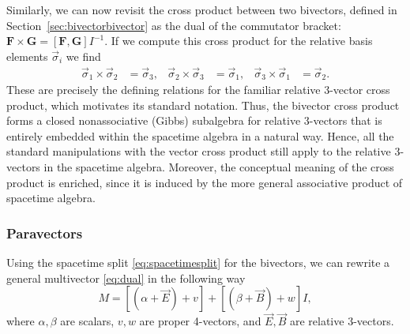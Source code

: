 \documentclass[1p,sort&compress]{elsarticle}
\numberwithin{equation}{section}
\newcommand{\rv}[1]{\vec{#1}}
\newcommand{\bv}[1]{\mathbf{#1}}
\begin{document}
Similarly, we can now revisit the cross product between two bivectors, defined in Section~\ref{sec:bivectorbivector} as the dual of the commutator bracket: $\bv{F}\times\bv{G} = [\bv{F},\bv{G}]I^{-1}$.  If we compute this cross product for the relative basis elements $\rv{\sigma}_i$ we find
\begin{align}\label{eq:crossbrackets}
  \rv{\sigma}_1 \times \rv{\sigma}_2 &= \rv{\sigma}_3, & \rv{\sigma}_2 \times \rv{\sigma}_3 &= \rv{\sigma}_1, & \rv{\sigma}_3 \times \rv{\sigma}_1 &= \rv{\sigma}_2.
\end{align}
These are precisely the defining relations for the familiar relative 3-vector cross product, which motivates its standard notation.  Thus, the bivector cross product forms a closed nonassociative (Gibbs) subalgebra for relative 3-vectors that is entirely embedded within the spacetime algebra in a natural way.  Hence, all the standard manipulations with the vector cross product still apply to the relative 3-vectors in the spacetime algebra.  Moreover, the conceptual meaning of the cross product is enriched, since it is induced by the more general associative product of spacetime algebra.


\subsubsection{Paravectors}


Using the spacetime split \eqref{eq:spacetimesplit} for the bivectors, we can rewrite a general multivector \eqref{eq:dual} in the following way
\begin{equation}\label{eq:biquaternion}
  M = \left[(\alpha + \rv{E}) + v\right] + \left[(\beta + \rv{B}) + w\right]I,
\end{equation}
where $\alpha,\beta$ are scalars, $v,w$ are proper 4-vectors, and $\rv{E},\rv{B}$ are relative 3-vectors.  
\end{document}
